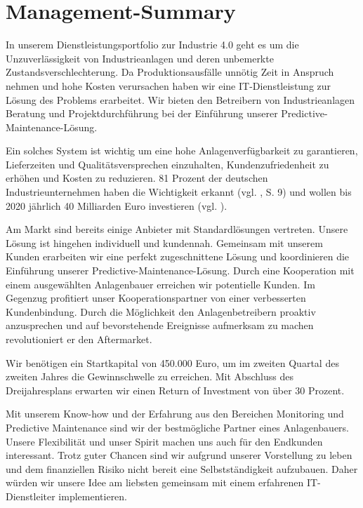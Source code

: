 \section{Management-Summary}

In unserem Dienstleistungsportfolio zur Industrie 4.0 geht es um die Unzuverlässigkeit von Industrieanlagen und deren unbemerkte Zustandsverschlechterung. Da Produktionsausfälle unnötig Zeit in Anspruch nehmen und hohe Kosten verursachen haben wir eine IT-Dienstleistung zur Lösung des Problems erarbeitet. Wir bieten den Betreibern von Industrieanlagen Beratung und Projektdurchführung bei der Einführung unserer Predictive-Maintenance-Lösung.

Ein solches System ist wichtig um eine hohe Anlagenverfügbarkeit zu garantieren, Lieferzeiten und Qualitätsversprechen einzuhalten, Kundenzufriedenheit zu erhöhen und Kosten zu reduzieren. 81 Prozent der deutschen Industrieunternehmen haben die Wichtigkeit erkannt (vgl. \cite{SasForsa}, S. 9) und wollen bis 2020 jährlich 40 Milliarden Euro investieren (vgl. \cite{IndustrieHohesPotenzial}).

Am Markt sind bereits einige Anbieter mit Standardlösungen vertreten. Unsere Lösung ist hingehen individuell und kundennah. Gemeinsam mit unserem Kunden erarbeiten wir eine perfekt zugeschnittene Lösung und koordinieren die Einführung unserer Predictive-Maintenance-Lösung. Durch eine Kooperation mit einem ausgewählten Anlagenbauer erreichen wir potentielle Kunden. Im Gegenzug profitiert unser Kooperationspartner von einer verbesserten Kundenbindung. Durch die Möglichkeit den Anlagenbetreibern proaktiv anzusprechen und auf bevorstehende Ereignisse aufmerksam zu machen revolutioniert er den Aftermarket.

Wir benötigen ein Startkapital von 450.000 Euro, um im zweiten Quartal des zweiten Jahres die Gewinnschwelle zu erreichen. Mit Abschluss des Dreijahresplans erwarten wir einen Return of Investment von über 30 Prozent.

Mit unserem Know-how und der Erfahrung aus den Bereichen Monitoring und Predictive Maintenance sind wir der bestmögliche Partner eines Anlagenbauers. Unsere Flexibilität und unser Spirit machen uns auch für den Endkunden interessant. Trotz guter Chancen sind wir aufgrund unserer Vorstellung zu leben und dem finanziellen Risiko nicht bereit eine Selbstständigkeit aufzubauen. Daher würden wir unsere Idee am liebsten gemeinsam mit einem erfahrenen IT-Dienstleiter implementieren.
